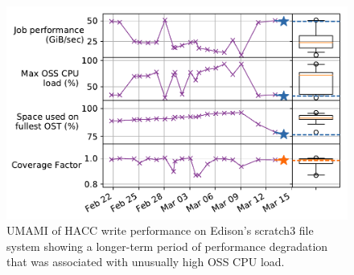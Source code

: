 \begin{figure}[t]
    \centering
    \includegraphics[width=1.0\columnwidth]{figs/umami-scratch3-hacc-write-long-term.pdf}
    \caption{UMAMI of HACC write performance on Edison's scratch3 file system showing a longer-term period of performance degradation that was associated with unusually high OSS CPU load.
    }
    \label{fig:umami-scratch3-hacc-write-long-term}
\vspace{-.2in}
\end{figure}
